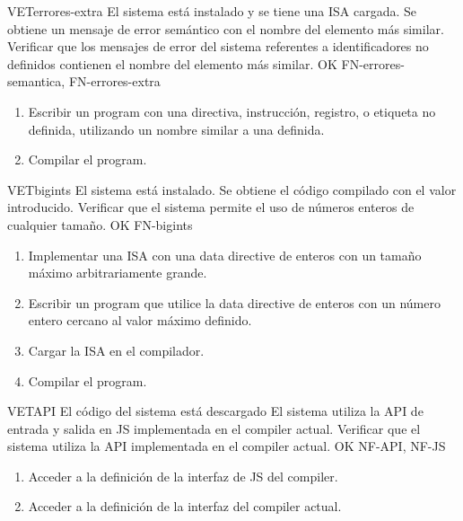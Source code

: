 \begin{testCase}{VET}{errores-extra}
    {El sistema está instalado y se tiene una \gls{ISA} cargada.} %
    {Se obtiene un mensaje de error semántico con el nombre del elemento más similar.} %
    {Verificar que los mensajes de error del sistema referentes a
    identificadores no definidos contienen el nombre del elemento más similar.} %
    {OK} %
    {FN-errores-semantica, FN-errores-extra} %
    \begin{enumerate}[leftmargin=*, topsep=0pt, noitemsep] %
        \item Escribir un \gls{program} con una directiva, instrucción,
        registro, o etiqueta no definida, utilizando un nombre similar a una
        definida.
        \item Compilar el \gls{program}.
    \end{enumerate}
\end{testCase}

\begin{testCase}{VET}{bigints}
    {El sistema está instalado.} %
    {Se obtiene el código compilado con el valor introducido.} %
    {Verificar que el sistema permite el uso de números enteros de cualquier tamaño.} %
    {OK} %
    {FN-bigints} %
    \begin{enumerate}[leftmargin=*, topsep=0pt, noitemsep] %
        \item Implementar una \gls{ISA} con una \gls{data directive} de
        enteros con un tamaño máximo arbitrariamente grande.
        \item Escribir un \gls{program} que utilice la \gls{data directive} de
        enteros con un número entero cercano al valor máximo definido.
        \item Cargar la \gls{ISA} en el compilador.
        \item Compilar el \gls{program}.
    \end{enumerate}
\end{testCase}

\begin{testCase}{VET}{API}
    {El código del sistema está descargado} %
    {El sistema utiliza la \gls{API} de entrada y salida en \gls{JS}
    implementada en el \gls{compiler} actual.} %
    {Verificar que el sistema utiliza la \gls{API} implementada en el \gls{compiler} actual.} %
    {OK} %
    {NF-API, NF-JS} %
    \begin{enumerate}[leftmargin=*, topsep=0pt, noitemsep] %
        \item Acceder a la definición de la interfaz de \gls{JS} del \gls{compiler}.
        \item Acceder a la definición de la interfaz del \gls{compiler} actual.
    \end{enumerate}
\end{testCase}

